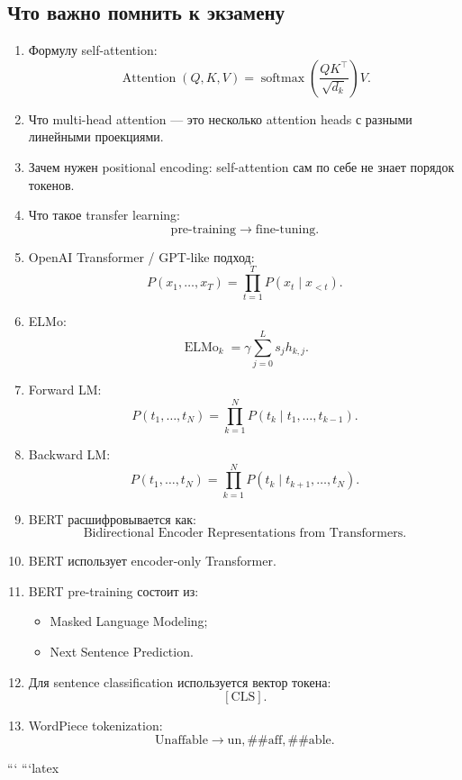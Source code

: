 \documentclass[a4paper,12pt]{article}
\begin{document}
\subsection{Что важно помнить к экзамену}

\begin{enumerate}
    \item Формулу self-attention:
    \[
    \operatorname{Attention}(Q,K,V)
    =
    \operatorname{softmax}
    \left(
    \frac{QK^\top}{\sqrt{d_k}}
    \right)V.
    \]

    \item Что multi-head attention --- это несколько attention heads с разными линейными проекциями.

    \item Зачем нужен positional encoding:
    self-attention сам по себе не знает порядок токенов.

    \item Что такое transfer learning:
    \[
    \text{pre-training} \rightarrow \text{fine-tuning}.
    \]

    \item OpenAI Transformer / GPT-like подход:
    \[
    P(x_1,\dots,x_T)
    =
    \prod_{t=1}^{T}
    P(x_t \mid x_{<t}).
    \]

    \item ELMo:
    \[
    \operatorname{ELMo}_k
    =
    \gamma
    \sum_{j=0}^{L}
    s_j h_{k,j}.
    \]

    \item Forward LM:
    \[
    P(t_1,\dots,t_N)
    =
    \prod_{k=1}^{N}
    P(t_k \mid t_1,\dots,t_{k-1}).
    \]

    \item Backward LM:
    \[
    P(t_1,\dots,t_N)
    =
    \prod_{k=1}^{N}
    P(t_k \mid t_{k+1},\dots,t_N).
    \]

    \item BERT расшифровывается как:
    \[
    \text{Bidirectional Encoder Representations from Transformers}.
    \]

    \item BERT использует encoder-only Transformer.

    \item BERT pre-training состоит из:
    \begin{itemize}
        \item Masked Language Modeling;
        \item Next Sentence Prediction.
    \end{itemize}

    \item Для sentence classification используется вектор токена:
    \[
    [\text{CLS}].
    \]

    \item WordPiece tokenization:
    \[
    \text{Unaffable}
    \rightarrow
    \text{un}, \text{\#\#aff}, \text{\#\#able}.
    \]
\end{enumerate}
```
```latex
\end{document}
